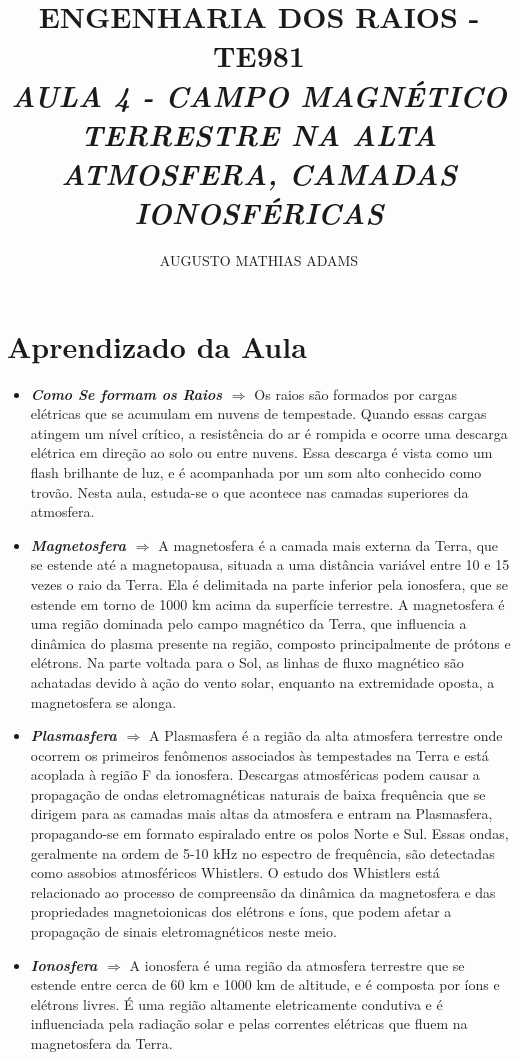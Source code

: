 \documentclass[a4paper, 12pt, onecolumn,singlespacing]{article}
\title{\normalsize{ENGENHARIA DOS RAIOS - TE981}\\ \huge{\textbf\textit{{AULA 4 - CAMPO MAGNÉTICO TERRESTRE NA ALTA ATMOSFERA, CAMADAS IONOSFÉRICAS}}\\}}
\author{\small{AUGUSTO MATHIAS ADAMS}}
\begin{document}
	
	\maketitle
	
	\section{Aprendizado da Aula}
	
	\begin{itemize}
		\item \textbf{\textit{Como Se formam os Raios $\Rightarrow$ }} Os raios são formados por cargas elétricas que se acumulam em nuvens de tempestade. Quando essas cargas atingem um nível crítico, a resistência do ar é rompida e ocorre uma descarga elétrica em direção ao solo ou entre nuvens. Essa descarga é vista como um flash brilhante de luz, e é acompanhada por um som alto conhecido como trovão. Nesta aula, estuda-se o que acontece nas camadas superiores da atmosfera.
		\item \textbf{\textit{Magnetosfera $\Rightarrow$ }}A magnetosfera é a camada mais externa da Terra, que se estende até a magnetopausa, situada a uma distância variável entre 10 e 15 vezes o raio da Terra. Ela é delimitada na parte inferior pela ionosfera, que se estende em torno de 1000 km acima da superfície terrestre. A magnetosfera é uma região dominada pelo campo magnético da Terra, que influencia a dinâmica do plasma presente na região, composto principalmente de prótons e elétrons. Na parte voltada para o Sol, as linhas de fluxo magnético são achatadas devido à ação do vento solar, enquanto na extremidade oposta, a magnetosfera se alonga.
		\item \textbf{\textit{Plasmasfera $\Rightarrow$ }} A Plasmasfera é a região da alta atmosfera terrestre onde ocorrem os primeiros fenômenos associados às tempestades na Terra e está acoplada à região F da ionosfera. Descargas atmosféricas podem causar a propagação de ondas eletromagnéticas naturais de baixa frequência que se dirigem para as camadas mais altas da atmosfera e entram na Plasmasfera, propagando-se em formato espiralado entre os polos Norte e Sul. Essas ondas, geralmente na ordem de 5-10 kHz no espectro de frequência, são detectadas como assobios atmosféricos Whistlers. O estudo dos Whistlers está relacionado ao processo de compreensão da dinâmica da magnetosfera e das propriedades magnetoionicas dos elétrons e íons, que podem afetar a propagação de sinais eletromagnéticos neste meio.
		\item \textbf{\textit{Ionosfera $\Rightarrow$ }}A ionosfera é uma região da atmosfera terrestre que se estende entre cerca de 60 km e 1000 km de altitude, e é composta por íons e elétrons livres. É uma região altamente eletricamente condutiva e é influenciada pela radiação solar e pelas correntes elétricas que fluem na magnetosfera da Terra.
		

\end{itemize}
\end{document}
